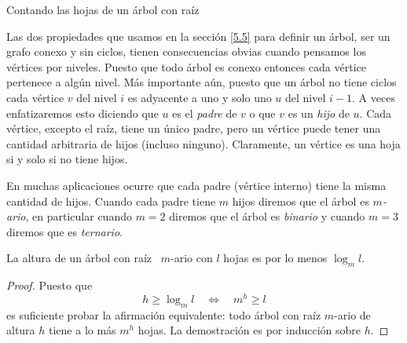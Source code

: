 \begin{section}{Contando las hojas de un árbol con raíz}

Las dos propiedades que usamos en la sección \ref{5.5} para
definir un árbol, ser un grafo conexo y sin ciclos, tienen consecuencias obvias cuando pensamos los
vértices por niveles. Puesto que todo árbol es conexo entonces cada vértice pertenece a algún nivel. Más importante
aún, puesto que un árbol no tiene ciclos  cada
vértice $v$ del nivel $i$ es adyacente a uno y solo uno $u$ del
nivel $i-1$. A veces enfatizaremos esto diciendo que $u$ es el
{\it {padre}} de $v$ o que $v$ es un {\it {hijo}} de $u$. Cada
   vértice,
excepto el raíz, tiene un único padre, pero un vértice puede tener
una cantidad arbitraria de hijos (incluso ninguno). Claramente, un
vértice es una hoja si y solo si no tiene hijos.

En muchas aplicaciones ocurre que cada padre (vértice interno)
tiene la misma cantidad de hijos. Cuando cada padre tiene $m$
hijos diremos que el árbol es {\em $m$-ario}, en particular cuando
$m=2$ diremos que el árbol es {\it binario}  
y cuando $m=3$ diremos que es {\it ternario}.

\begin{teorema}\label{t6.1} La altura de un árbol con raíz\,\,\,
$m$-ario con $l$ hojas es por lo menos $\log_ml$.
\end{teorema}
\begin{proof} Puesto que
$$
h \ge \log_ml \quad \Leftrightarrow \quad m^h \ge l
$$
es suficiente probar la afirmación equivalente: todo árbol con
raíz $m$-ario de altura $h$ tiene a lo más $m^h$ hojas. La
demostración es por inducción sobre $h$.


\end{proof}
\end{section}
